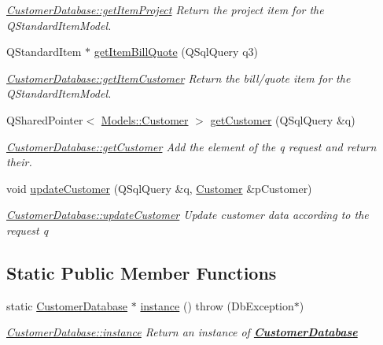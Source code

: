 \begin{DoxyCompactItemize}
\begin{DoxyCompactList}\small\item\em \hyperlink{classDatabases_1_1CustomerDatabase_a641001509d0385000b5b831c134c78c4}{Customer\-Database\-::get\-Item\-Project} Return the project item for the Q\-Standard\-Item\-Model. \end{DoxyCompactList}\item 
Q\-Standard\-Item $\ast$ \hyperlink{classDatabases_1_1CustomerDatabase_ab9311e006dc1e58486d6e682064912b5}{get\-Item\-Bill\-Quote} (Q\-Sql\-Query q3)
\begin{DoxyCompactList}\small\item\em \hyperlink{classDatabases_1_1CustomerDatabase_abad5bf2b61181f9896404850c4acfb84}{Customer\-Database\-::get\-Item\-Customer} Return the bill/quote item for the Q\-Standard\-Item\-Model. \end{DoxyCompactList}\item 
Q\-Shared\-Pointer$<$ \hyperlink{classModels_1_1Customer}{Models\-::\-Customer} $>$ \hyperlink{classDatabases_1_1CustomerDatabase_a23017b6db7808fa1d03e55e063418670}{get\-Customer} (Q\-Sql\-Query \&q)
\begin{DoxyCompactList}\small\item\em \hyperlink{classDatabases_1_1CustomerDatabase_ab0544439382fb6891cd7d27f67cb120c}{Customer\-Database\-::get\-Customer} Add the element of the {\itshape q} request and return their. \end{DoxyCompactList}\item 
void \hyperlink{classDatabases_1_1CustomerDatabase_aedb0c575bd9141547e4e084fd260beb7}{update\-Customer} (Q\-Sql\-Query \&q, \hyperlink{classModels_1_1Customer}{Customer} \&p\-Customer)
\begin{DoxyCompactList}\small\item\em \hyperlink{classDatabases_1_1CustomerDatabase_a2ef9838798500e7ad4a09a3ed401fc8b}{Customer\-Database\-::update\-Customer} Update customer data according to the request {\itshape q} \end{DoxyCompactList}\end{DoxyCompactItemize}
\subsection*{Static Public Member Functions}
\begin{DoxyCompactItemize}
\item 
static \hyperlink{classDatabases_1_1CustomerDatabase}{Customer\-Database} $\ast$ \hyperlink{classDatabases_1_1CustomerDatabase_a564b9978741e84e75d7e20003f7bf515}{instance} ()  throw (\-Db\-Exception$\ast$)
\begin{DoxyCompactList}\small\item\em \hyperlink{classDatabases_1_1CustomerDatabase_a564b9978741e84e75d7e20003f7bf515}{Customer\-Database\-::instance} Return an instance of {\bfseries \hyperlink{classDatabases_1_1CustomerDatabase}{Customer\-Database}} \end{DoxyCompactList}\end{DoxyCompactItemize}
